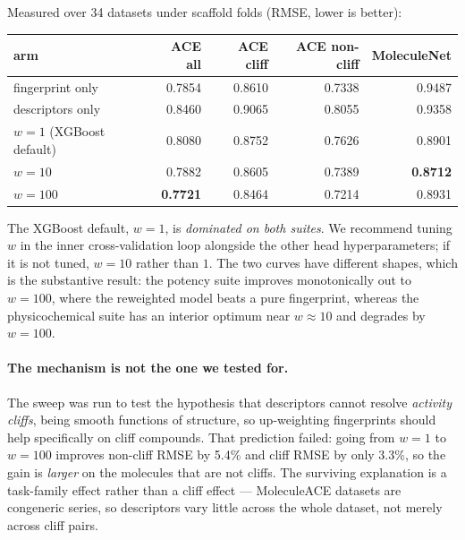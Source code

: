 Measured over 34 datasets under scaffold folds (RMSE, lower is better):

\begin{center}
\begin{tabular}{lrrrr}
\toprule
arm & ACE all & ACE cliff & ACE non-cliff & MoleculeNet \\
\midrule
fingerprint only     & 0.7854 & 0.8610 & 0.7338 & 0.9487 \\
descriptors only     & 0.8460 & 0.9065 & 0.8055 & 0.9358 \\
$w = 1$ (XGBoost default) & 0.8080 & 0.8752 & 0.7626 & 0.8901 \\
$w = 10$             & 0.7882 & 0.8605 & 0.7389 & \textbf{0.8712} \\
$w = 100$            & \textbf{0.7721} & 0.8464 & 0.7214 & 0.8931 \\
\bottomrule
\end{tabular}
\end{center}

The XGBoost default, $w = 1$, is \emph{dominated on both suites}. We recommend tuning $w$ in the
inner cross-validation loop alongside the other head hyperparameters; if it is not tuned,
$w = 10$ rather than $1$. The two curves have different shapes, which is the substantive result:
the potency suite improves monotonically out to $w = 100$, where the reweighted model beats a
pure fingerprint, whereas the physicochemical suite has an interior optimum near $w \approx 10$
and degrades by $w = 100$.

\paragraph{The mechanism is not the one we tested for.} The sweep was run to test the
hypothesis that descriptors cannot resolve \emph{activity cliffs}, being smooth functions of
structure, so up-weighting fingerprints should help specifically on cliff compounds. That
prediction failed: going from $w = 1$ to $w = 100$ improves non-cliff RMSE by 5.4\% and cliff
RMSE by only 3.3\%, so the gain is \emph{larger} on the molecules that are not cliffs. The
surviving explanation is a task-family effect rather than a cliff effect --- MoleculeACE
datasets are congeneric series, so descriptors vary little across the whole dataset, not merely
across cliff pairs.

